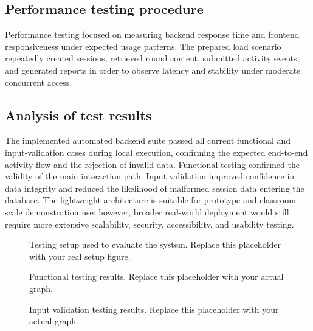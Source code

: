 \documentclass[conference]{IEEEtran}
\begin{document}
\subsection{Performance testing procedure}

Performance testing focused on measuring backend response time and frontend responsiveness under expected usage patterns. The prepared load scenario repeatedly created sessions, retrieved round content, submitted activity events, and generated reports in order to observe latency and stability under moderate concurrent access.

\subsection{Analysis of test results}

The implemented automated backend suite passed all current functional and input-validation cases during local execution, confirming the expected end-to-end activity flow and the rejection of invalid data. Functional testing confirmed the validity of the main interaction path. Input validation improved confidence in data integrity and reduced the likelihood of malformed session data entering the database. The lightweight architecture is suitable for prototype and classroom-scale demonstration use; however, broader real-world deployment would still require more extensive scalability, security, accessibility, and usability testing.

\begin{figure}[htbp]
\centering
{}
\caption{Testing setup used to evaluate the system. Replace this placeholder with your real setup figure.}
\label{fig:test_setup}
\end{figure}

\begin{figure}[htbp]
\centering
{}
\caption{Functional testing results. Replace this placeholder with your actual graph.}
\label{fig:functional_results}
\end{figure}

\begin{figure}[htbp]
\centering
{}
\caption{Input validation testing results. Replace this placeholder with your actual graph.}
\label{fig:validation_results}
\end{figure}
\end{document}

